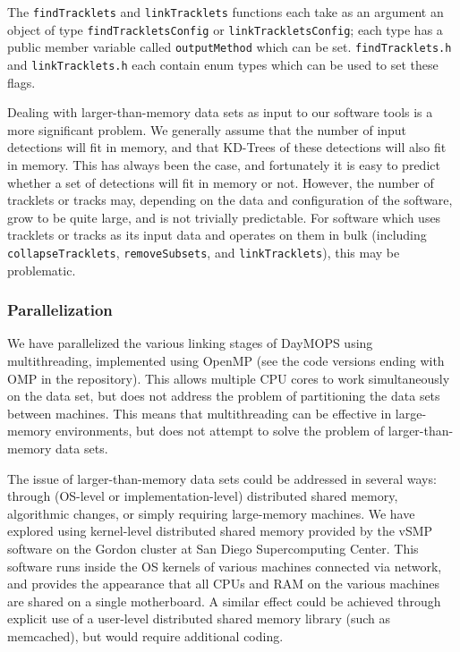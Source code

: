 The {\tt findTracklets} and {\tt linkTracklets} functions each take as
an argument an object of type {\tt findTrackletsConfig} or
{\tt linkTrackletsConfig}; each type has a public member variable
called {\tt outputMethod} which can be set.  {\tt findTracklets.h} and
{\tt linkTracklets.h} each contain enum types which can be used to set
these flags.

Dealing with larger-than-memory data sets as input to our software
tools is a more significant problem.  We generally assume that the
number of input detections will fit in memory, and that KD-Trees of
these detections will also fit in memory.  This has always been the
case, and fortunately it is easy to predict whether a set of
detections will fit in memory or not.  However, the number of
tracklets or tracks may, depending on the data and configuration of
the software, grow to be quite large, and is not trivially
predictable.  For software which uses tracklets or tracks as its input
data and operates on them in bulk (including {\tt collapseTracklets},
{\tt removeSubsets}, and {\tt linkTracklets}), this may be problematic.


\subsubsection{Parallelization}
\label{parallelization}

We have parallelized the various linking stages of DayMOPS using
multithreading, implemented using OpenMP (see the code versions ending
with OMP in the repository).  This allows multiple CPU
cores to work simultaneously on the data set, but does not address the
problem of partitioning the data sets between machines.  This means
that multithreading can be effective in large-memory environments, but
does not attempt to solve the problem of larger-than-memory data sets.

The issue of larger-than-memory data sets could be addressed in
several ways: through (OS-level or implementation-level) distributed
shared memory, algorithmic changes, or simply requiring large-memory
machines.  We have explored using kernel-level distributed shared
memory provided by the vSMP software on the Gordon cluster at San
Diego Supercomputing Center.  This software runs inside the OS kernels
of various machines connected via network, and provides the appearance
that all CPUs and RAM on the various machines are shared on a single
motherboard.  A similar effect could be achieved through explicit use
of a user-level distributed shared memory library (such as memcached),
but would require additional coding.

